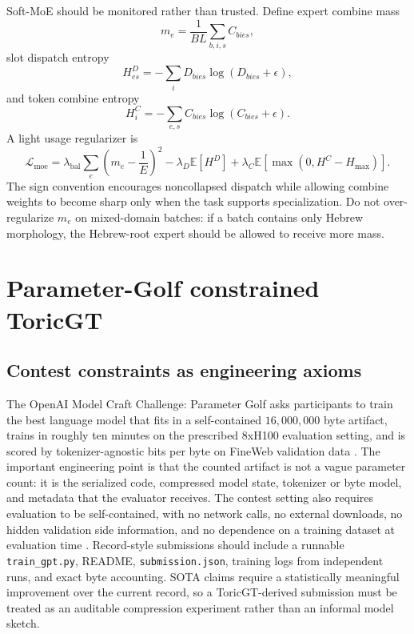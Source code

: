 \documentclass[11pt]{article}
\theoremstyle{definition}
\theoremstyle{plain}
\theoremstyle{remark}
\numberwithin{equation}{section}
\newcommand{\Eop}{\mathbb{E}}
\begin{document}
Soft-MoE should be monitored rather than trusted.  Define expert combine mass
\begin{equation}
  m_e=\frac{1}{B L}\sum_{b,i,s}C_{b i e s},
\end{equation}
slot dispatch entropy
\begin{equation}
  H_{e s}^{D}=-\sum_i D_{b i e s}\log(D_{b i e s}+\epsilon),
\end{equation}
and token combine entropy
\begin{equation}
  H_i^C=-\sum_{e,s}C_{b i e s}\log(C_{b i e s}+\epsilon).
\end{equation}
A light usage regularizer is
\begin{equation}
  \mathcal L_{\mathrm{moe}}=\lambda_{\mathrm{bal}}\sum_e\left(m_e-\frac1E\right)^2
  -\lambda_D\Eop[H^D]+\lambda_C\Eop\left[\max(0,H^C-H_{\max})\right].
\end{equation}
The sign convention encourages noncollapsed dispatch while allowing combine weights to become sharp only when the task supports specialization.  Do not over-regularize $m_e$ on mixed-domain batches: if a batch contains only Hebrew morphology, the Hebrew-root expert should be allowed to receive more mass.

\section{Parameter-Golf constrained ToricGT}

\subsection{Contest constraints as engineering axioms}

The OpenAI Model Craft Challenge: Parameter Golf asks participants to train the best language model that fits in a self-contained $16{,}000{,}000$ byte artifact, trains in roughly ten minutes on the prescribed 8xH100 evaluation setting, and is scored by tokenizer-agnostic bits per byte on FineWeb validation data \cite{openai2026paramgolf}.  The important engineering point is that the counted artifact is not a vague parameter count: it is the serialized code, compressed model state, tokenizer or byte model, and metadata that the evaluator receives.  The contest setting also requires evaluation to be self-contained, with no network calls, no external downloads, no hidden validation side information, and no dependence on a training dataset at evaluation time \cite{openai2026paramgolf}.  Record-style submissions should include a runnable \texttt{train\_gpt.py}, README, \texttt{submission.json}, training logs from independent runs, and exact byte accounting.  SOTA claims require a statistically meaningful improvement over the current record, so a ToricGT-derived submission must be treated as an auditable compression experiment rather than an informal model sketch.
\end{document}
